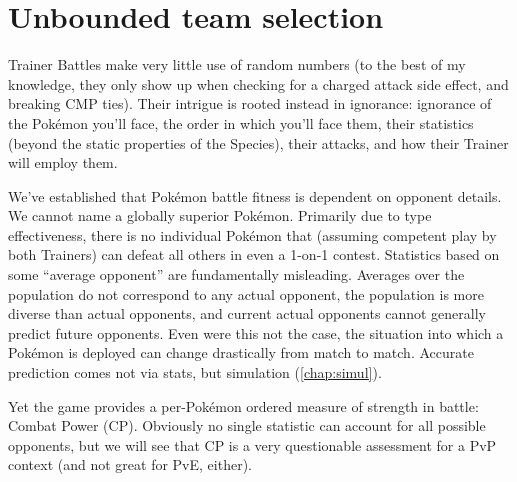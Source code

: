 \chapter{Unbounded team selection\label{chap:unbounded}}
Trainer Battles make very little use of random numbers (to the best of my
 knowledge, they only show up when checking for a charged attack side
 effect, and breaking CMP ties).
Their intrigue is rooted instead in ignorance: ignorance of
 the Pokémon you'll face, the order in which you'll face them,
 their statistics (beyond the static properties of the Species),
 their attacks, and how their Trainer will employ them.

We've established that Pokémon battle fitness is dependent on opponent details.
We cannot name a globally superior Pokémon.
Primarily due to type effectiveness, there is no individual Pokémon that
  (assuming competent play by both Trainers) can defeat all others in even a
  1-on-1 contest.
Statistics based on some ``average opponent'' are fundamentally misleading.
Averages over the population do not correspond to any actual opponent,
 the population is more diverse than actual opponents,
 and current actual opponents cannot generally predict future opponents.
Even were this not the case, the situation into which a Pokémon is deployed
 can change drastically from match to match.
Accurate prediction comes not via stats, but simulation (\autoref{chap:simul}).

Yet the game provides a per-Pokémon ordered measure of strength in battle: Combat Power (CP).
Obviously no single statistic can account for all possible opponents, but
 we will see that CP is a very questionable assessment for a PvP
 context (and not great for PvE, either).

